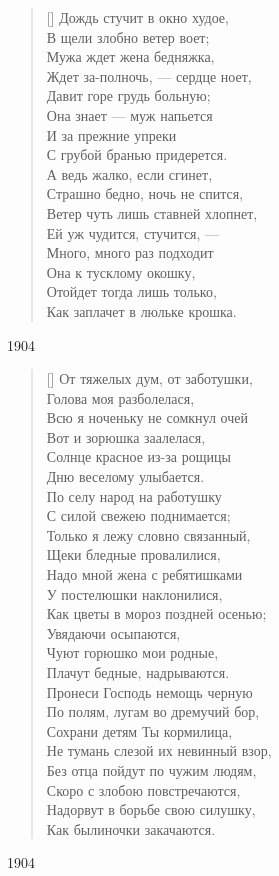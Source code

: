 \settowidth{\versewidth}{Дождь стучит в окно худое}
\begin{verse}[\versewidth]
Дождь стучит в окно худое,\\
В щели злобно ветер воет;\\
Мужа ждет жена бедняжка,\\
Ждет за-полночь, --- сердце ноет,\\
Давит горе грудь больную;\\
Она знает --- муж напьется\\
И за прежние упреки\\
С грубой бранью придерется.\\
А ведь жалко, если сгинет,\\
Страшно бедно, ночь не спится,\\
Ветер чуть лишь ставней хлопнет,\\
Ей уж чудится, стучится, ---\\
Много, много раз подходит\\
Она к тусклому окошку,\\
Отойдет тогда лишь только,\\
Как заплачет в люльке крошка.
\end{verse}
1904

\settowidth{\versewidth}{От тяжелых дум, от заботушки}
\begin{verse}[\versewidth]
От тяжелых дум, от заботушки,\\
Голова моя разболелася,\\
Всю я ноченьку не сомкнул очей\\
Вот и зорюшка заалелася,\\
Солнце красное из-за рощицы\\
Дню веселому улыбается.\\
По селу народ на работушку\\
С силой свежею поднимается;\\
Только я лежу словно связанный,\\
Щеки бледные провалилися,\\
Надо мной жена с ребятишками\\
У постелюшки наклонилися,\\
Как цветы в мороз поздней осенью;\\
Увядаючи осыпаются,\\
Чуют горюшко мои родные,\\
Плачут бедные, надрываются.\\
Пронеси Господь немощь черную\\
По полям, лугам во дремучий бор,\\
Сохрани детям Ты кормилица,\\
Не тумань слезой их невинный взор,\\
Без отца пойдут по чужим людям,\\
Скоро с злобою повстречаются,\\
Надорвут в борьбе свою силушку,\\
Как былиночки закачаются.
\end{verse}
1904

